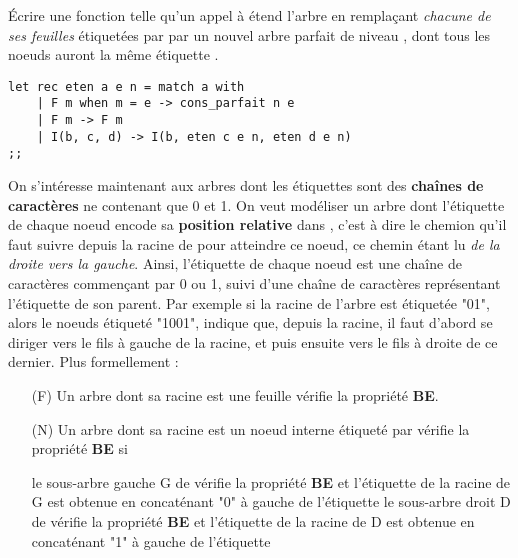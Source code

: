\documentclass{report}
\begin{document}
\begin{exo}[Arbres]
\begin{q}{3}
        Écrire une fonction  telle
        qu'un appel à  étend l'arbre  en remplaçant
        \textit{chacune de ses feuilles} étiquetées par  par un nouvel
        arbre parfait de niveau , dont tous les noeuds auront la même
        étiquette .
        \begin{lstlisting}
let rec eten a e n = match a with
    | F m when m = e -> cons_parfait n e
    | F m -> F m
    | I(b, c, d) -> I(b, eten c e n, eten d e n)
;;      \end{lstlisting}
    \end{q}
    \begin{q}{4}
        On s'intéresse maintenant aux arbres dont les étiquettes sont des \textbf{chaînes
        de caractères} ne contenant que 0 et 1. On veut modéliser un arbre 
        dont l'étiquette de chaque noeud encode sa \textbf{position relative} dans
        , c'est à dire le chemion qu'il faut suivre depuis la racine de 
        pour atteindre ce noeud, ce chemin étant lu \textit{de la droite vers la gauche}. Ainsi,
        l'étiquette de chaque noeud est une chaîne de caractères commençant par 0 ou 1,
        suivi d'une chaîne de caractères représentant l'étiquette de son parent. Par exemple
        si la racine de l'arbre  est étiquetée "01", alors le noeuds étiqueté
        "1001", indique que, depuis la racine, il faut d'abord se diriger vers le fils à gauche
        de la racine, et puis ensuite vers le fils à droite de ce dernier. Plus formellement :
        \begin{enumerate}
            \item[(F)] Un arbre  dont sa racine est une feuille vérifie la propriété \textbf{BE}.
            \item[(N)] Un arbre  dont sa racine est un noeud interne étiqueté par
             vérifie la propriété \textbf{BE} si
            \begin{enumerate}
                \itt le sous-arbre gauche G de  vérifie la propriété \textbf{BE} et
                l'étiquette de la racine de G est obtenue en concaténant "0" à gauche de
                l'étiquette 
                \itt le sous-arbre droit D de  vérifie la propriété \textbf{BE} et
                l'étiquette de la racine de D est obtenue en concaténant "1" à gauche de
                l'étiquette 
            \end{enumerate}

\end{enumerate}
\end{q}
\end{exo}
\end{document}
